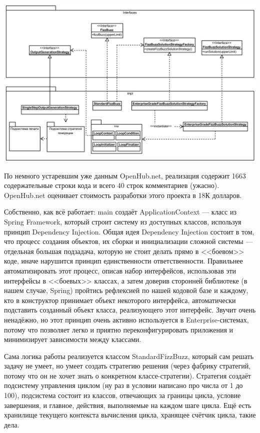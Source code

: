 \documentclass[a5paper]{article}
\begin{document}
\begin{center}
    \includegraphics[width=\textwidth]{fizzBuzzArchitecture.png}
\end{center}

По немного устаревшим уже данным OpenHub.net, реализация содержит 1663 содержательные строки кода и всего 40 строк комментариев (ужасно). OpenHub.net оценивает стоимость разработки этого проекта в 18К долларов.

Собственно, как всё работает: main создаёт ApplicationContext --- класс из Spring Framework, который строит систему из доступных классов, используя принцип Dependency Injection. Общая идея Dependency Injection состоит в том, что процесс создания объектов, их сборки и инициализации сложной системы --- отдельная большая подзадача, которую не стоит делать прямо в <<боевом>> коде, иначе нарушится принцип единственности ответственности. Правильнее автоматизировать этот процесс, описав набор интерфейсов, использовав эти интерфейсы в <<боевых>> классах, а затем доверив сторонней библиотеке (в нашем случае, Spring) пройтись рефлексией по нашей кодовой базе и каждому, кто в конструктор принимает объект некоторого интерфейса, автоматически подставить созданный объект класса, реализующего этот интерфейс. Звучит очень ненадёжно, но этот принцип очень активно используется в Enterprise-системах, потому что позволяет легко и приятно переконфигурировать приложения и минимизирует зависимости между классами.

Сама логика работы реализуется классом StandardFizzBuzz, который сам решать задачу не умеет, но умеет создать стратегию решения (через фабрику стратегий, потому что он не хочет знать о конкретном классе-стратегии). Стратегия создаёт подсистему управления циклом (ну раз в условии написано про числа от 1 до 100), подсистема состоит из классов, отвечающих за границы цикла, условие завершения, и главное, действия, выполняемые на каждом шаге цикла. Ещё есть хранилище текущего контекста вычисления цикла, хранящее счётчик цикла, такие дела.
\end{document}
